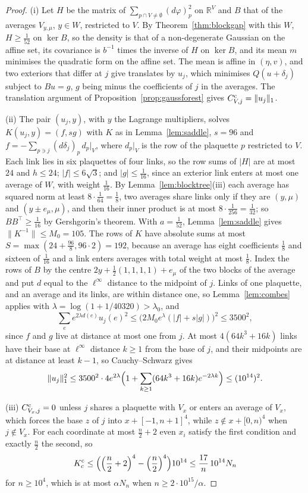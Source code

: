 \documentclass[11pt]{amsart}
\theoremstyle{definition}
\theoremstyle{remark}
\numberwithin{equation}{section}
\newcommand{\R}{\mathbb{R}}
\begin{document}
\begin{proof}
(i) Let $H$ be the matrix of $\sum_{p\cap V\ne\emptyset}(d\varphi)_p^2$ on
$\R^V$ and $B$ that of the averages $V_{y,\mu}$, $y\in W$, restricted to
$V$. By Theorem~\ref{thm:blockgap} with this $W$, $H\ge\frac1{52}$ on $\ker
B$, so the density is that of a non-degenerate Gaussian on the affine set,
its covariance is $b^{-1}$ times the inverse of $H$ on $\ker B$, and its mean
$m$ minimises the quadratic form on the affine set. The mean is affine in
$(\eta,v)$, and two exteriors that differ at $j$ give translates by $u_j$,
which minimises $Q(u+\delta_j)$ subject to $B u=g$, $g$ being minus the
coefficients of $j$ in the averages. The translation argument of
Proposition~\ref{prop:gaussforest} gives $C^{\rm c}_{V,j}=\|u_j\|_1$.

(ii) The pair $(u_j,y)$, with $y$ the Lagrange multipliers, solves
$K(u_j,y)=(f,sg)$ with $K$ as in Lemma~\ref{lem:saddle}, $s=96$ and $f=
-\sum_{p\ni j}(d\delta_j)_p\,d_p|_V$, where $d_p|_V$ is the row of the
plaquette $p$ restricted to $V$. Each link lies in six plaquettes of four
links, so the row sums of $|H|$ are at most $24$ and $h\le24$; $|f|\le
6\sqrt3$; and $|g|\le\frac1{16}$, since an exterior link enters at most one
average of $W$, with weight $\frac1{16}$. By Lemma~\ref{lem:blocktree}(iii)
each average has squared norm at least $8\cdot\frac1{64}=\frac18$, two
averages share links only if they are $(y,\mu)$ and $(y\pm e_\mu,\mu)$, and
then their inner product is at most $8\cdot\frac1{256}=\frac1{32}$; so $BB^\top
\ge\frac1{16}$ by Gershgorin's theorem. With $a=\frac1{52}$,
Lemma~\ref{lem:saddle} gives $\|K^{-1}\|\le M_0=105$. The rows of $K$ have
absolute sums at most $S=\max(24+\frac{96}8,96\cdot2)=192$, because an
average has eight coefficients $\frac18$ and sixteen of $\frac1{16}$ and a
link enters averages with total weight at most $\frac18$. Index the rows of
$B$ by the centre $2y+\frac12(1,1,1,1)+e_\mu$ of the two blocks of the
average and put $d$ equal to the $\ell^\infty$ distance to the midpoint of
$j$. Links of one plaquette, and an average and its links, are within
distance one, so Lemma~\ref{lem:combes} applies with $\lambda=\log(1+
1/40320)>\lambda_0$, and
\[
\sum_ee^{2\lambda d(e)}u_j(e)^2\le\bigl(2M_0e^\lambda(|f|+s|g|)\bigr)^2
\le3500^2,
\]
since $f$ and $g$ live at distance at most one from $j$. At most
$4(64k^3+16k)$ links have their base at $\ell^\infty$ distance $k\ge1$ from
the base of $j$, and their midpoints are at distance at least $k-1$, so
Cauchy--Schwarz gives
\[
\|u_j\|_1^2\le3500^2\cdot4e^{2\lambda}\Bigl(1+\sum_{k\ge1}(64k^3+16k)
e^{-2\lambda k}\Bigr)\le(10^{14})^2 .
\]

(iii) $C^{\rm c}_{V_x,j}=0$ unless $j$ shares a plaquette with $V_x$ or
enters an average of $V_x$, which forces the base $z$ of $j$ into
$x+[-1,n+1]^4$, while $z\notin x+[0,n)^4$ when $j\notin V_x$. For each
coordinate at most $\frac n2+2$ even $x_i$ satisfy the first condition and
exactly $\frac n2$ the second, so
\[
K^{\rm c}_c\le\Bigl(\Bigl(\frac n2+2\Bigr)^4-\Bigl(\frac n2\Bigr)^4\Bigr)
10^{14}\le\frac{17}n\,10^{14}N_n
\]
for $n\ge10^4$, which is at most $\alpha N_n$ when $n\ge2\cdot10^{15}/\alpha$.
\end{proof}
\end{document}
